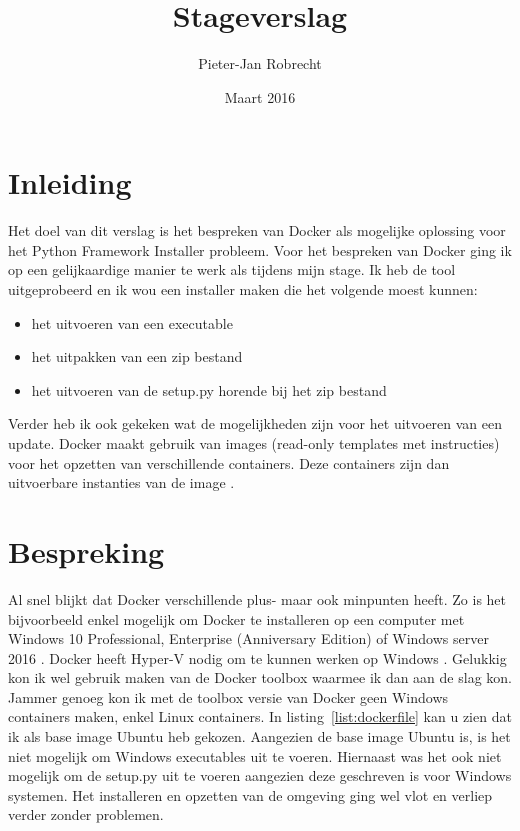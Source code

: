 \documentclass{article}
\title{Stageverslag}
\author{\mbox{Pieter-Jan} Robrecht}
\date{Maart 2016}
\begin{document}


\clearpage
\setcounter{page}{1}

\tableofcontents
\lstlistoflistings
\clearpage

\section{Inleiding}
Het doel van dit verslag is het bespreken van Docker als mogelijke oplossing voor het Python Framework Installer probleem.
Voor het bespreken van Docker ging ik op een gelijkaardige manier te werk als tijdens mijn stage.
Ik heb de tool uitgeprobeerd en ik wou een installer maken die het volgende moest kunnen:
\begin{itemize}
\item het uitvoeren van een executable
\item het uitpakken van een zip bestand
\item het uitvoeren van de setup.py horende bij het zip bestand
\end{itemize}
Verder heb ik ook gekeken wat de mogelijkheden zijn voor het uitvoeren van een update.
Docker maakt gebruik van images (read-only templates met instructies) voor het opzetten van verschillende containers.
Deze containers zijn dan uitvoerbare instanties van de image \citep{docker}.

\section{Bespreking}
Al snel blijkt dat Docker verschillende plus- maar ook minpunten heeft.
Zo is het bijvoorbeeld enkel mogelijk om Docker te installeren op een computer met Windows 10 Professional, Enterprise (Anniversary Edition) of Windows server 2016 \citep{microsoft}.
Docker heeft Hyper-V nodig om te kunnen werken op Windows \citep{dockerNodig}.
Gelukkig kon ik wel gebruik maken van de Docker toolbox waarmee ik dan aan de slag kon.
Jammer genoeg kon ik met de toolbox versie van Docker geen Windows containers maken, enkel Linux containers.
In listing~\vref{list:dockerfile} kan u zien dat ik als base image Ubuntu heb gekozen.
Aangezien de base image Ubuntu is, is het niet mogelijk om Windows executables uit te voeren.
Hiernaast was het ook niet mogelijk om de setup.py uit te voeren aangezien deze geschreven is voor Windows systemen.
Het installeren en opzetten van de omgeving ging wel vlot en verliep verder zonder problemen.
\end{document}
